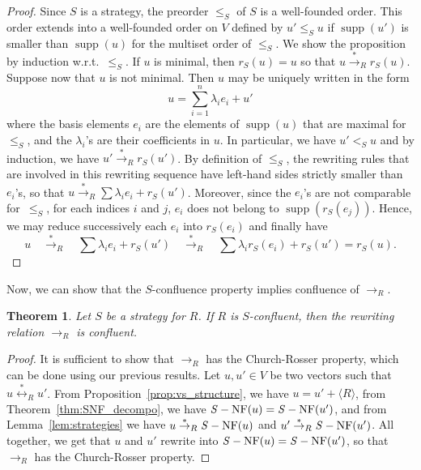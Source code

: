 \documentclass[11pt]{article}
\newtheorem{theorem}{Theorem}[section]
\theoremstyle{definition}
\newcommand\wrt{w.r.t.}
\newcommand\ordS{\leq_S}
\DeclareMathOperator{\supp}{supp}
\newcommand\Span[1]{\langle #1\rangle}
\newcommand\rewR{\to_R}
\newcommand\transR{\overset{*}{\to}_R}
\newcommand\equivR{\overset{*}{\leftrightarrow}_R}
\DeclareMathOperator{\SNF}{{\it S}-NF}
\begin{document}
\begin{proof}
  Since $S$ is a strategy, the preorder $\ordS$ of $S$ is a
  well-founded order. This order extends into a well-founded order on $V$
  defined by $u'\ordS u$ if $\supp(u')$ is smaller than $\supp(u)$ for
  the multiset order of $\ordS$. We show the proposition by induction
  \wrt\ $\ordS$. If $u$ is minimal, then $r_S(u)=u$ so that
  $u\transR r_S(u)$. Suppose now that $u$ is not minimal. Then $u$ may be
  uniquely written in the form 
  \begin{equation*}\label{equ:decompo_max}
    u=\sum_{i=1}^n\lambda_ie_i+u'
  \end{equation*}
  where the basis elements $e_i$ are the elements of $\supp(u)$ that are
  maximal for~$\ordS$, and the $\lambda_i$'s are their coefficients in
  $u$. In particular, we have $u'<_S u$ and by induction, we have
  $u'\transR r_S(u')$. By definition of $\ordS$, the rewriting rules that
  are involved in this rewriting sequence have left-hand sides strictly
  smaller than $e_i$'s, so that $u\transR\sum\lambda_ie_i+r_S(u')$.
  Moreover, since the $e_i$'s are not comparable for~$\ordS$, for each
  indices $i$ and $j$, $e_i$ does not belong to $\supp(r_S(e_j))$. Hence,
  we may reduce successively each $e_i$ into $r_S(e_i)$ and finally have
  \[
  u \quad\transR\quad
  \sum \lambda_ie_i+r_S(u')\quad\transR\quad
  \sum\lambda_ir_S(e_i) + r_S(u')
  =r_S(u).\]
\end{proof}
\smallskip

Now, we can show that the $S$-confluence property implies confluence of
$\rewR$.
\medskip

\begin{theorem}\label{thm-S-conf}
  Let $S$ be a strategy for $R$. If $R$ is $S$-confluent, then the
  rewriting relation $\rewR$ is confluent.
\end{theorem}

\begin{proof}
  It is sufficient to show that $\rewR$ has the Church-Rosser property,
  which can be done using our previous results. Let $u,u'\in V$ be two
  vectors such that $u\equivR u'$. From
  Proposition~\ref{prop:vs_structure}, we have $u=u'+\Span{R}$, from
  Theorem~\ref{thm:SNF_decompo}, we have $\SNF(u)=\SNF(u')$,
  and from Lemma~\ref{lem:strategies} we have $u\transR\SNF(u)$ and
  $u'\transR\SNF(u')$. All together, we get that $u$ and $u'$ rewrite 
  into $\SNF(u)=\SNF(u')$, so that~$\rewR$ has the Church-Rosser
  property.
\end{proof}
\smallskip
\end{document}
